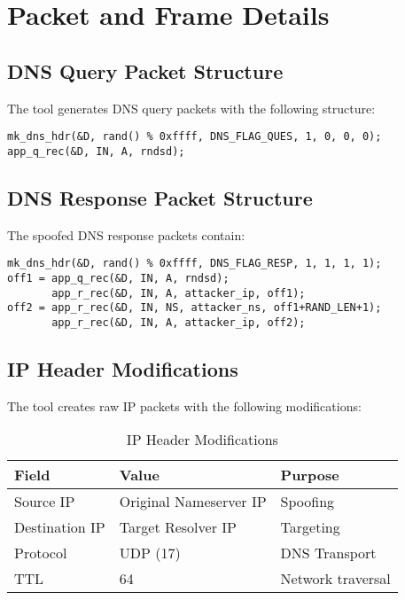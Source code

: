 \documentclass[12pt,a4paper]{article}
\begin{document}
\section{Packet and Frame Details}

\subsection{DNS Query Packet Structure}

The tool generates DNS query packets with the following structure:

\begin{lstlisting}[caption=DNS Query Packet Generation]
mk_dns_hdr(&D, rand() % 0xffff, DNS_FLAG_QUES, 1, 0, 0, 0); 
app_q_rec(&D, IN, A, rndsd);
\end{lstlisting}

\subsection{DNS Response Packet Structure}

The spoofed DNS response packets contain:

\begin{lstlisting}[caption=Spoofed DNS Response Structure]
mk_dns_hdr(&D, rand() % 0xffff, DNS_FLAG_RESP, 1, 1, 1, 1);
off1 = app_q_rec(&D, IN, A, rndsd);
       app_r_rec(&D, IN, A, attacker_ip, off1);
off2 = app_r_rec(&D, IN, NS, attacker_ns, off1+RAND_LEN+1);
       app_r_rec(&D, IN, A, attacker_ip, off2);
\end{lstlisting}

\subsection{IP Header Modifications}

The tool creates raw IP packets with the following modifications:

\begin{table}[H]
\centering
\begin{tabular}{|l|l|l|}
\hline
\textbf{Field} & \textbf{Value} & \textbf{Purpose} \\
\hline
Source IP & Original Nameserver IP & Spoofing \\
Destination IP & Target Resolver IP & Targeting \\
Protocol & UDP (17) & DNS Transport \\
TTL & 64 & Network traversal \\
\hline
\end{tabular}
\caption{IP Header Modifications}
\label{tab:ip_header}
\end{table}
\end{document}
